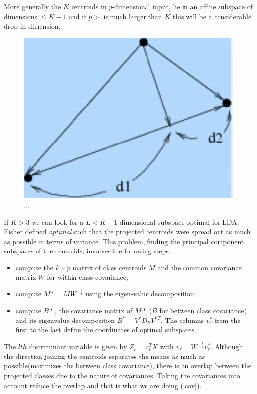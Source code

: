 More generally the $K$ centroids in $p$-dimensional input, lie in an affine subspace of dimensions $\le K-1$ and if $p>$ is much larger than $K$ this will be a considerable drop in dimension.


\begin{figure}
\centering
\includegraphics[scale=0.4]{img/proj}
\caption{...}
\label{proj}
\end{figure}

If $K>3$ we can look for a $L<K-1$ dimensional subspace optimal for LDA. Fisher defined \textit{optimal} such that the projected centroids were spread out as much as possible in terms of variance.
This problem, finding the principal component subspaces of the centroids, involves the following steps:
\begin{itemize}
\item compute the $k\times p$ matrix of class centroids $M$ and the common covariance matrix $W$ for within-class covariance;
\item compute $M*=MW^{-\frac{1}{2}}$ using the eigen-value decomposition;
\item compute $B*$, the covariance matrix of $M*$ ($B$ for between class covariance) and its eigenvalue decomposition $B^{*}=V^{*}D_BV^{*T}$. The columns $v^*_\ell$ from the first to the last define the coordinates of optimal subspaces.
\end{itemize}
The $lth$ discriminant variable is given by $Z_\ell =  v_\ell^TX$ with $v_\ell=W^{-\frac{1}{2}} v^*_\ell$.  Although the direction joining the centroids separates the means as much as possible(maximizes the between class covariance), there is an overlap between the projected classes due to the nature of covariances. Taking the covariances into account reduce the overlap and that is what we are doing (\autoref{cov}).

